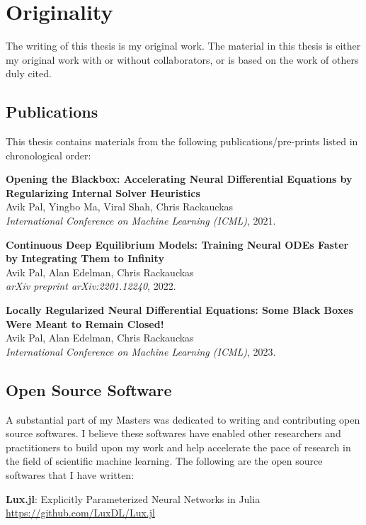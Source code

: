 \chapter*{Originality}

The writing of this thesis is my original work. The material in this thesis is either my original work with or without collaborators, or is based on the work of others duly cited.

\section*{Publications}

This thesis contains materials from the following publications/pre-prints listed in chronological order:

\textbf{Opening the Blackbox: Accelerating Neural Differential Equations by Regularizing Internal Solver Heuristics}\\
Avik Pal, Yingbo Ma, Viral Shah, Chris Rackauckas\\
\textit{International Conference on Machine Learning (ICML)}, 2021.

\textbf{Continuous Deep Equilibrium Models: Training Neural ODEs Faster by Integrating Them to Infinity}\\
Avik Pal, Alan Edelman, Chris Rackauckas\\
\textit{arXiv preprint arXiv:2201.12240}, 2022.

\textbf{Locally Regularized Neural Differential Equations: Some Black Boxes Were Meant to Remain Closed!}\\
Avik Pal, Alan Edelman, Chris Rackauckas\\
\textit{International Conference on Machine Learning (ICML)}, 2023.

\section*{Open Source Software}

A substantial part of my Masters was dedicated to writing and contributing open source softwares. I believe these softwares have enabled other researchers and practitioners to build upon my work and help accelerate the pace of research in the field of scientific machine learning. The following are the open source softwares that I have written:

\textbf{Lux.jl}: Explicitly Parameterized Neural Networks in Julia\\
{\small \url{https://github.com/LuxDL/Lux.jl}}

